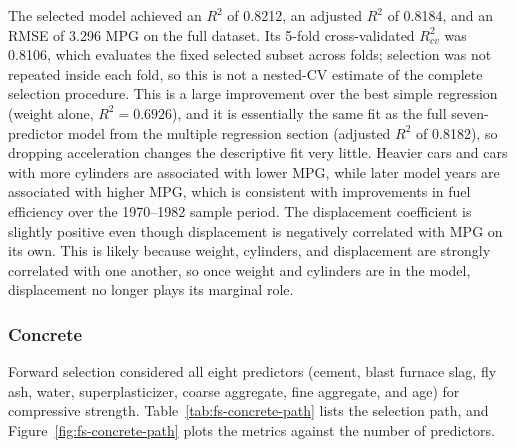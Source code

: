 \documentclass{article}
\begin{document}
The selected model achieved an $R^2$ of 0.8212, an adjusted $R^2$ of 0.8184, and an RMSE of 3.296 MPG on the full dataset. Its 5-fold cross-validated $R^2_{cv}$ was 0.8106, which evaluates the fixed selected subset across folds; selection was not repeated inside each fold, so this is not a nested-CV estimate of the complete selection procedure. This is a large improvement over the best simple regression (weight alone, $R^2 = 0.6926$), and it is essentially the same fit as the full seven-predictor model from the multiple regression section (adjusted $R^2$ of 0.8182), so dropping acceleration changes the descriptive fit very little. Heavier cars and cars with more cylinders are associated with lower MPG, while later model years are associated with higher MPG, which is consistent with improvements in fuel efficiency over the 1970--1982 sample period. The displacement coefficient is slightly positive even though displacement is negatively correlated with MPG on its own. This is likely because weight, cylinders, and displacement are strongly correlated with one another, so once weight and cylinders are in the model, displacement no longer plays its marginal role.

\subsubsection{Concrete}

Forward selection considered all eight predictors (cement, blast furnace slag, fly ash, water, superplasticizer, coarse aggregate, fine aggregate, and age) for compressive strength. Table~\ref{tab:fs-concrete-path} lists the selection path, and Figure~\ref{fig:fs-concrete-path} plots the metrics against the number of predictors.
\end{document}
